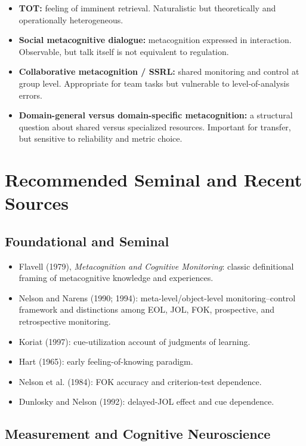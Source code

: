 \documentclass[a4paper]{article}
\begin{document}
\begin{itemize}
      \item \textbf{TOT:} feeling of imminent retrieval. Naturalistic but theoretically and operationally heterogeneous.
      \item \textbf{Social metacognitive dialogue:} metacognition expressed in interaction. Observable, but talk itself is not equivalent to regulation.
      \item \textbf{Collaborative metacognition / SSRL:} shared monitoring and control at group level. Appropriate for team tasks but vulnerable to level-of-analysis errors.
      \item \textbf{Domain-general versus domain-specific metacognition:} a structural question about shared versus specialized resources. Important for transfer, but sensitive to reliability and metric choice.
   \end{itemize}

   \section{Recommended Seminal and Recent Sources}

   \subsection{Foundational and Seminal}

   \begin{itemize}
      \item Flavell (1979), \emph{Metacognition and Cognitive Monitoring}: classic definitional framing of metacognitive knowledge and experiences.
      \item Nelson and Narens (1990; 1994): meta-level/object-level monitoring--control framework and distinctions among EOL, JOL, FOK, prospective, and retrospective monitoring.
      \item Koriat (1997): cue-utilization account of judgments of learning.
      \item Hart (1965): early feeling-of-knowing paradigm.
      \item Nelson et al. (1984): FOK accuracy and criterion-test dependence.
      \item Dunlosky and Nelson (1992): delayed-JOL effect and cue dependence.
   \end{itemize}

   \subsection{Measurement and Cognitive Neuroscience}
\end{document}
